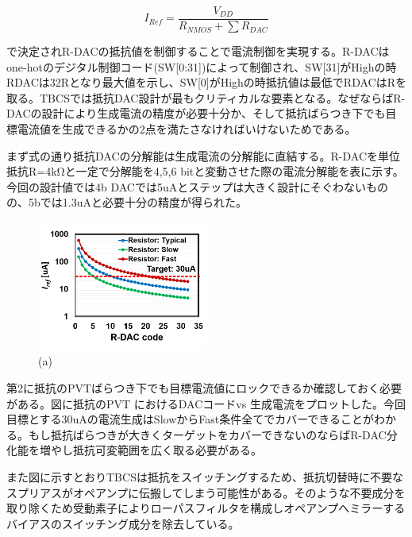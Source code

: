 \documentclass[letterpaper, 10 pt, conference]{ieeeconf}  %
\begin{document}
$$I_{Ref} = \frac{V_{DD}}{R_{NMOS}+\sum R_{DAC}}$$

で決定されR-DACの抵抗値を制御することで電流制御を実現する。R-DACはone-hotのデジタル制御コード(SW[0:31])によって制御され、SW[31]がHighの時RDACは32Rとなり最大値を示し、SW[0]がHighの時抵抗値は最低でRDACはRを取る。TBCSでは抵抗DAC設計が最もクリティカルな要素となる。なぜならばR-DACの設計により生成電流の精度が必要十分か、そして抵抗ばらつき下でも目標電流値を生成できるかの2点を満たさなければいけないためである。

\begin{table}[]
\end{table}

まず式の通り抵抗DACの分解能は生成電流の分解能に直結する。R-DACを単位抵抗R=4kΩと一定で分解能を4,5,6 bitと変動させた際の電流分解能を表に示す。今回の設計値では4b DACでは5uAとステップは大きく設計にそぐわないものの、5bでは1.3uAと必要十分の精度が得られた。

\begin{figure}[!]
\centering
 \includegraphics[width=0.5\textwidth]{figs/rdaccode.png}
  \caption{(a) 
}
\label{fig2}
\end{figure}

第2に抵抗のPVTばらつき下でも目標電流値にロックできるか確認しておく必要がある。図に抵抗のPVT におけるDACコードvs 生成電流をプロットした。今回目標とする30uAの電流生成はSlowからFast条件全てでカバーできることがわかる。もし抵抗ばらつきが大きくターゲットをカバーできないのならばR-DAC分化能を増やし抵抗可変範囲を広く取る必要がある。

また図に示すとおりTBCSは抵抗をスイッチングするため、抵抗切替時に不要なスプリアスがオペアンプに伝搬してしまう可能性がある。そのような不要成分を取り除くため受動素子によりローパスフィルタを構成しオペアンプへミラーするバイアスのスイッチング成分を除去している。
\end{document}
